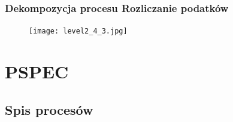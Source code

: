 \documentclass[a4paper,11pt]{article}
\begin{document}
\subsubsection{Dekompozycja procesu Rozliczanie podatków}
    \begin{figure}[!htb]
    \centerline{\texttt{[image: level2\_4\_3.jpg]}}
    \label{fig:level2_4_3}
    \end{figure}
    \newpage
    

\section{PSPEC}

\subsection{Spis procesów}
\end{document}
